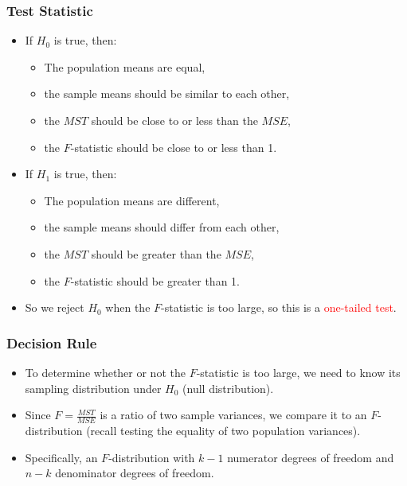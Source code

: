 \documentclass[12pt]{beamer}
\begin{document}
\begin{frame}
	\frametitle{Test Statistic}
	
	\begin{itemize}[label={\color{blue}$\blacktriangleright$}]
		\item If $H_0$ is true, then:
		\begin{itemize}[label={\color{blue}$\Rightarrow$}]
			\item The population means are equal,
			\item the sample means should be similar to each other,
			\item the $MST$ should be close to or less than the $MSE$,
			\item the $F$-statistic should be close to or less than 1.
		\end{itemize}
		
		\item If $H_1$ is true, then:
		\begin{itemize}[label={\color{blue}$\Rightarrow$}]
			\item The population means are different,
			\item the sample means should differ from each other,
			\item the $MST$ should be greater than the $MSE$,
			\item the $F$-statistic should be greater than 1.
		\end{itemize}
		
		\item So we reject $H_0$ when the $F$-statistic is too large, so this is a \textcolor{red}{one-tailed test}.
	\end{itemize}
	
\end{frame}
\begin{frame}
	\frametitle{Decision Rule}
	
	\begin{itemize}[label={\color{blue}$\blacktriangleright$}]
		\item To determine whether or not the $F$-statistic is too large, we need to know its sampling distribution under $H_0$ (null distribution).
		
		\item Since $F = \frac{MST}{MSE}$ is a ratio of two sample variances, we compare it to an $F$-distribution (recall testing the equality of two population variances).
		
		\item Specifically, an $F$-distribution with $k - 1$ numerator degrees of freedom and $n - k$ denominator degrees of freedom.
	\end{itemize}
	
\end{frame}
\end{document}
